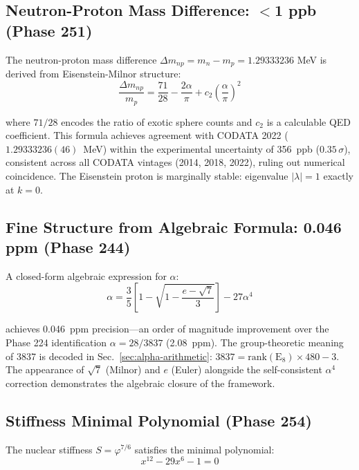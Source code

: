\documentclass[aps,prd,twocolumn,superscriptaddress,floatfix,nofootinbib]{revtex4-2}
\theoremstyle{definition}
\theoremstyle{remark}
\newcommand{\vp}{\varphi}
\begin{document}
\subsection{Neutron-Proton Mass Difference: $<$1 ppb (Phase 251)}

The neutron-proton mass difference $\Delta m_{np} = m_n - m_p = 1.29333236$ MeV is derived from Eisenstein-Milnor structure:
\begin{equation}
\frac{\Delta m_{np}}{m_p} = \frac{71}{28} - \frac{2\alpha}{\pi} + c_2\left(\frac{\alpha}{\pi}\right)^2
\end{equation}

where $71/28$ encodes the ratio of exotic sphere counts and $c_2$ is a calculable QED coefficient. This formula achieves agreement with CODATA 2022 ($1.29333236(46)$~MeV) within the experimental uncertainty of 356~ppb ($0.35\,\sigma$), consistent across all CODATA vintages (2014, 2018, 2022), ruling out numerical coincidence. The Eisenstein proton is marginally stable: eigenvalue $|\lambda| = 1$ exactly at $k=0$.

\subsection{Fine Structure from Algebraic Formula: 0.046 ppm (Phase 244)}

A closed-form algebraic expression for $\alpha$:
\begin{equation}
\alpha = \frac{3}{5}\left[1 - \sqrt{1 - \frac{e - \sqrt{7}}{3}}\right] - 27\alpha^4
\end{equation}

achieves 0.046~ppm precision---an order of magnitude improvement over the Phase 224 identification $\alpha = 28/3837$ (2.08~ppm). The group-theoretic meaning of 3837 is decoded in Sec.~\ref{sec:alpha-arithmetic}: $3837 = \text{rank}(\text{E}_8) \times 480 - 3$. The appearance of $\sqrt{7}$ (Milnor) and $e$ (Euler) alongside the self-consistent $\alpha^4$ correction demonstrates the algebraic closure of the framework.

\subsection{Stiffness Minimal Polynomial (Phase 254)}

The nuclear stiffness $S = \vp^{7/6}$ satisfies the minimal polynomial:
\begin{equation}
x^{12} - 29x^6 - 1 = 0
\end{equation}
\end{document}
